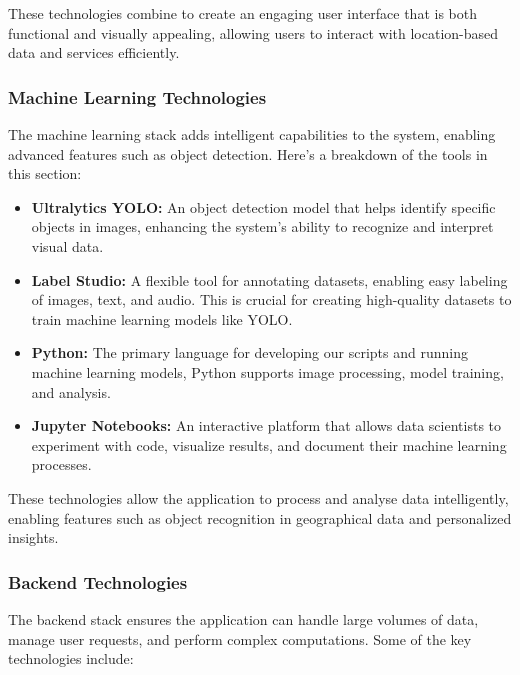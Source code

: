 These technologies combine to create an engaging user interface that is both functional and visually appealing, allowing users to interact with location{-}based data and services efficiently.

\subsubsection{Machine Learning Technologies}

The machine learning stack adds intelligent capabilities to the system, enabling advanced features such as object detection. Here’s a breakdown of the tools in this section: 

\begin{itemize}
    \item{} \textbf{Ultralytics YOLO:}  An object detection model that helps identify specific objects in images, enhancing the system's ability to recognize and interpret visual data. 
    \item{} \textbf{Label Studio:} A flexible tool for annotating datasets, enabling easy labeling of images, text, and audio. This is crucial for creating high-quality datasets to train machine learning models like YOLO. 
    \item{} \textbf{Python:} The primary language for developing our scripts and running machine learning models, Python supports image processing, model training, and analysis. 
    \item{} \textbf{Jupyter Notebooks:} An interactive platform that allows data scientists to experiment with code, visualize results, and document their machine learning processes. 
\end{itemize}

These technologies allow the application to process and analyse data intelligently, enabling features such as object recognition in geographical data and personalized insights.

\subsubsection{Backend Technologies}

The backend stack ensures the application can handle large volumes of data, manage user requests, and perform complex computations. Some of the key technologies include:

